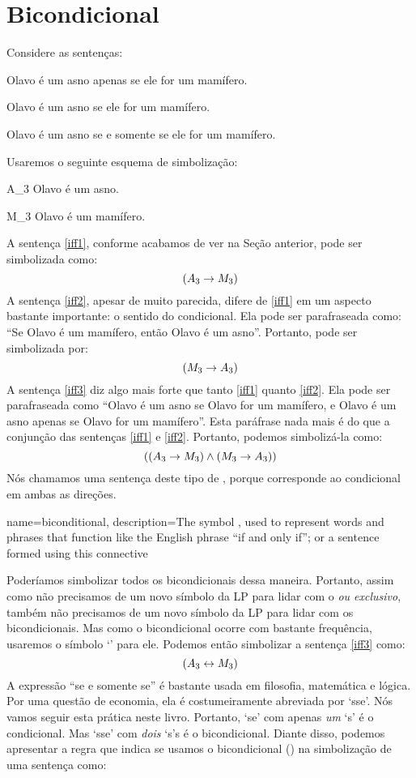 \section{Bicondicional}
Considere as sentenças:
	\begin{earg}
		\item[\ex{iff1}] Olavo é um asno apenas se ele for um mamífero.
		\item[\ex{iff2}] Olavo é um asno se ele for um mamífero.
		\item[\ex{iff3}] Olavo é um asno se e somente se ele for um mamífero.
	\end{earg}
Usaremos o seguinte esquema de simbolização:
	\begin{ekey}
		\item[A_3] Olavo é um asno.
		\item[M_3] Olavo é um mamífero.
	\end{ekey}
A sentença \ref{iff1}, conforme acabamos de ver na Seção anterior, pode ser simbolizada como:
$$(A_3 \rightarrow M_3)$$
A sentença \ref{iff2}, apesar de muito parecida, difere de \ref{iff1} em um aspecto bastante importante:
o sentido do condicional.
Ela pode ser parafraseada como:
``Se Olavo é um mamífero, então Olavo é um asno''.
Portanto, pode ser simbolizada por:
$$(M_3 \rightarrow A_3)$$
A sentença \ref{iff3} diz algo mais forte que tanto \ref{iff1} quanto \ref{iff2}.
Ela pode ser parafraseada como ``Olavo é um asno se Olavo for um mamífero, e Olavo é um asno apenas se Olavo for um mamífero''.
Esta paráfrase nada mais é do que a conjunção das sentenças \ref{iff1} e \ref{iff2}.
Portanto, podemos simbolizá-la como:
$$((A_3 \rightarrow M_3) \wedge (M_3 \rightarrow A_3))$$
Nós chamamos uma sentença deste tipo de , porque corresponde ao condicional em ambas as direções.

{
name=biconditional,
description={The symbol \eiff, used to represent words and phrases that function like the English phrase ``if and only if''; or a sentence formed using this connective}
}

Poderíamos simbolizar todos os bicondicionais dessa maneira.
Portanto, assim como não precisamos de um novo símbolo da LP para lidar com o \emph{ou exclusivo}, também não precisamos de um novo símbolo da LP para lidar com os bicondicionais.
Mas como o bicondicional ocorre com bastante frequência, usaremos o símbolo `\eiff' para ele.
Podemos então simbolizar a sentença \ref{iff3} como:
$$(A_3 \leftrightarrow M_3)$$
A expressão ``se e somente se'' é bastante usada em filosofia, matemática e lógica.
Por uma questão de economia, ela é costumeiramente abreviada por `sse'.
Nós vamos seguir esta prática neste livro.
Portanto, `se' com apenas \emph {um} `s' é o condicional.
Mas `sse' com \emph{dois} `s's é o bicondicional.
Diante disso, podemos apresentar a regra que indica se usamos o bicondicional (\eiff) na simbolização de uma sentença como:


